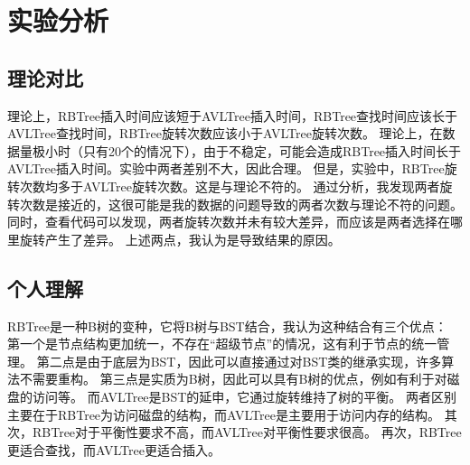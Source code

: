 \documentclass[UTF8]{ctexart}
\begin{document}
\section{实验分析}
\subsection{理论对比}
理论上，RBTree插入时间应该短于AVLTree插入时间，RBTree查找时间应该长于AVLTree查找时间，RBTree旋转次数应该小于AVLTree旋转次数。
理论上，在数据量极小时（只有20个的情况下），由于不稳定，可能会造成RBTree插入时间长于AVLTree插入时间。实验中两者差别不大，因此合理。
但是，实验中，RBTree旋转次数均多于AVLTree旋转次数。这是与理论不符的。
通过分析，我发现两者旋转次数是接近的，这很可能是我的数据的问题导致的两者次数与理论不符的问题。同时，查看代码可以发现，两者旋转次数并未有较大差异，而应该是两者选择在哪里旋转产生了差异。
上述两点，我认为是导致结果的原因。
\subsection{个人理解}
RBTree是一种B树的变种，它将B树与BST结合，我认为这种结合有三个优点：
第一个是节点结构更加统一，不存在“超级节点”的情况，这有利于节点的统一管理。
第二点是由于底层为BST，因此可以直接通过对BST类的继承实现，许多算法不需要重构。
第三点是实质为B树，因此可以具有B树的优点，例如有利于对磁盘的访问等。
而AVLTree是BST的延申，它通过旋转维持了树的平衡。
两者区别主要在于RBTree为访问磁盘的结构，而AVLTree是主要用于访问内存的结构。
其次，RBTree对于平衡性要求不高，而AVLTree对平衡性要求很高。
再次，RBTree更适合查找，而AVLTree更适合插入。
\end{document}
